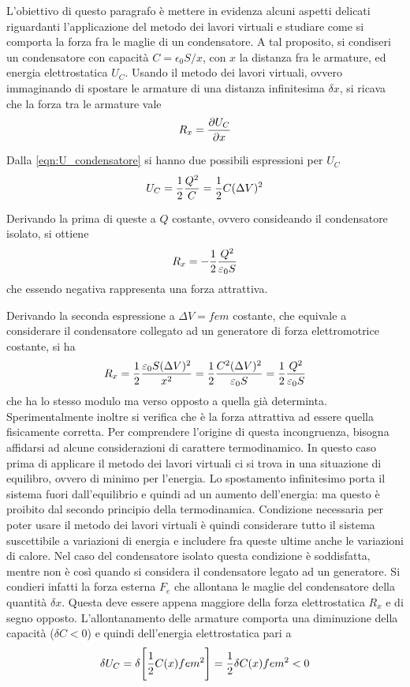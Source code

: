 \label{par:corrente_correntestazionaria_complementi}
L'obiettivo di questo paragrafo è mettere in evidenza alcuni aspetti delicati riguardanti l'applicazione
del metodo dei lavori virtuali e studiare come si comporta la forza fra le maglie di un condensatore.
A tal proposito, si condiseri un condensatore con capacità $C=\epsilon_0 S/x$, con $x$ la distanza fra le armature, ed
energia elettrostatica $U_C$. Usando il metodo dei lavori virtuali, ovvero immaginando di spostare le armature di una
distanza infinitesima $\delta x$, si ricava che la forza tra le armature vale
\[
R_x=\pdv{U_C}{x}
\]

Dalla \ref{eqn:U_condensatore}  si hanno due possibili espressioni per $U_C$
\[
U_C=\frac{1}{2} \frac{Q^2}{C}=\frac{1}{2} C (\Delta V)^2
\]

Derivando la prima di queste a $Q$ costante, ovvero consideando il condensatore isolato, si ottiene
\[
R_x=-\frac{1}{2}\frac{Q^2}{\varepsilon_0 S}
\]
che essendo negativa rappresenta una forza attrattiva.

Derivando la seconda espressione a $\Delta V=fem$ costante, che equivale a considerare il condensatore
collegato ad un generatore di forza elettromotrice costante, si ha
\[
R_x=\frac{1}{2}\frac{\varepsilon_0 S (\Delta V)^2}{x^2}=\frac{1}{2}\frac{C^2 (\Delta V)^2}{\varepsilon_0 S}=\frac{1}{2}\frac{Q^2}{\varepsilon_0 S}
\]
che ha lo stesso modulo ma verso opposto a quella già determinta. Sperimentalmente inoltre si verifica che
è la forza attrattiva ad essere quella fisicamente corretta.
Per comprendere l'origine di questa incongruenza, bisogna affidarsi ad alcune considerazioni di carattere termodinamico.
In questo caso prima di applicare il metodo dei lavori virtuali ci si trova in una situazione di equilibro, ovvero di minimo
per l'energia. Lo spostamento infinitesimo porta il sistema fuori dall'equilibrio e quindi ad un aumento dell'energia:
ma questo è proibito dal secondo principio della termodinamica. Condizione necessaria per poter usare il metodo dei
lavori virtuali è quindi considerare tutto il sistema suscettibile a variazioni di energia e includere fra queste ultime
anche le variazioni di calore. Nel caso del condensatore isolato questa condizione è soddisfatta, mentre non è così
quando si considera il condensatore legato ad un generatore. Si condieri infatti la forza esterna $F_e$ che allontana le
maglie del condensatore della quantità $\delta x$. Questa deve essere appena maggiore della forza elettrostatica $R_x$
e di segno opposto. L'allontanamento delle armature comporta una diminuzione della capacità ($\delta C<0$) e quindi dell'energia
elettrostatica pari a
\[
\delta U_C =\delta\Biggl[\frac{1}{2}C(x) fem^2\Biggr]=\frac{1}{2} \delta C(x) fem^2<0
\]

